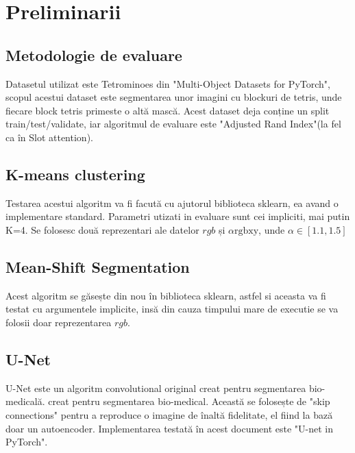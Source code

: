 \section{Preliminarii}

\subsection{Metodologie de evaluare}

Datasetul utilizat este Tetrominoes din "Multi-Object Datasets for PyTorch"\cite{multiobjectdatasets19}, 
scopul acestui dataset este segmentarea unor imagini cu blockuri de tetris, unde fiecare block tetris primeste o altă mască. Acest dataset deja conține un split train/test/validate,
iar algoritmul de evaluare este "Adjusted Rand Index"(la fel ca în Slot attention\cite{locatello2020object}). 
\subsection{K-means clustering}
Testarea acestui algoritm va fi facută cu ajutorul biblioteca sklearn, ea avand o implementare standard. Parametri utizati in evaluare sunt cei impliciti, mai putin K=4.
Se folosesc două reprezentari ale datelor $rgb$ și $\alpha\text{rgbxy}$, unde $\alpha\in[1.1,1.5]$

\subsection{Mean-Shift Segmentation}
Acest algoritm se găsește din nou în biblioteca sklearn, astfel si aceasta va fi testat cu argumentele implicite, insă
din cauza timpului mare de executie se va folosii doar reprezentarea $rgb$.

\subsection{U-Net}
U-Net\cite{RonnebergerFB15} este un algoritm convolutional original creat pentru segmentarea bio-medicală. creat pentru segmentarea bio-medical.
Această se folosește de "skip connections" pentru a reproduce o imagine de înaltă fidelitate, el fiind la bază doar un autoencoder. Implementarea testată în acest document 
este "U-net in PyTorch"\cite{BUDA2019218}.



